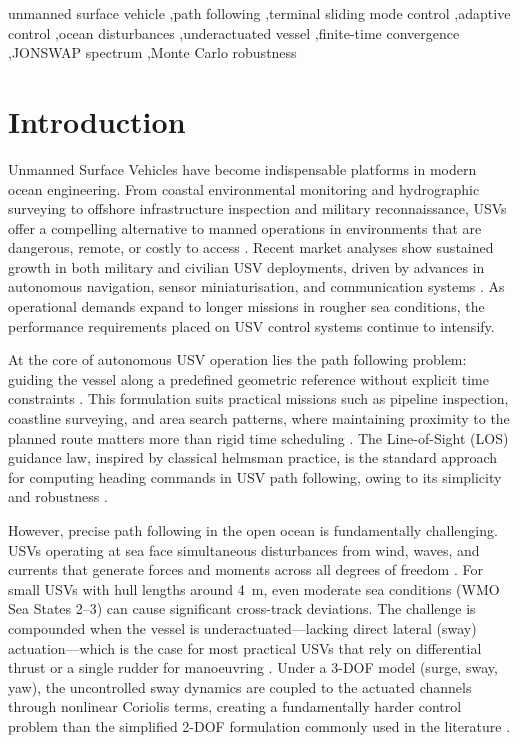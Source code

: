 \documentclass[review]{cas-dc}
\begin{document}
\begin{keywords}
unmanned surface vehicle \sep path following \sep terminal sliding mode control \sep adaptive control \sep ocean disturbances \sep underactuated vessel \sep finite-time convergence \sep JONSWAP spectrum \sep Monte Carlo robustness
\end{keywords}

\maketitle


\section{Introduction}
\label{sec:intro}

Unmanned Surface Vehicles have become indispensable platforms in modern ocean engineering. From coastal environmental monitoring and hydrographic surveying to offshore infrastructure inspection and military reconnaissance, USVs offer a compelling alternative to manned operations in environments that are dangerous, remote, or costly to access \citep{Fossen2011,Liu2019,Wang2019}. Recent market analyses show sustained growth in both military and civilian USV deployments, driven by advances in autonomous navigation, sensor miniaturisation, and communication systems \citep{Barrera2021}. As operational demands expand to longer missions in rougher sea conditions, the performance requirements placed on USV control systems continue to intensify.

At the core of autonomous USV operation lies the path following problem: guiding the vessel along a predefined geometric reference without explicit time constraints \citep{Fossen2003}. This formulation suits practical missions such as pipeline inspection, coastline surveying, and area search patterns, where maintaining proximity to the planned route matters more than rigid time scheduling \citep{Zhao2021}. The Line-of-Sight (LOS) guidance law, inspired by classical helmsman practice, is the standard approach for computing heading commands in USV path following, owing to its simplicity and robustness \citep{Fossen2017,Pettersen2001}.

However, precise path following in the open ocean is fundamentally challenging. USVs operating at sea face simultaneous disturbances from wind, waves, and currents that generate forces and moments across all degrees of freedom \citep{Li2023}. For small USVs with hull lengths around 4~m, even moderate sea conditions (WMO Sea States 2--3) can cause significant cross-track deviations. The challenge is compounded when the vessel is underactuated---lacking direct lateral (sway) actuation---which is the case for most practical USVs that rely on differential thrust or a single rudder for manoeuvring \citep{Do2009}. Under a 3-DOF model (surge, sway, yaw), the uncontrolled sway dynamics are coupled to the actuated channels through nonlinear Coriolis terms, creating a fundamentally harder control problem than the simplified 2-DOF formulation commonly used in the literature \citep{Fossen2011}.
\end{document}
